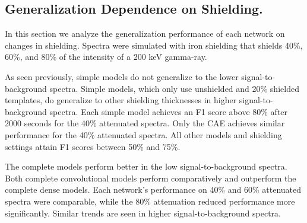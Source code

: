 \subsection{Generalization Dependence on Shielding.}

In this section we analyze the generalization performance of each network on changes in shielding. Spectra were simulated with iron shielding that shields 40\%, 60\%, and 80\% of the intensity of a 200 keV gamma-ray.

As seen previously, simple models do not generalize to the lower signal-to-background spectra. Simple models, which only use unshielded and 20\% shielded templates, do generalize to other shielding thicknesses in higher signal-to-background spectra. Each simple model achieves an F1 score above 80\% after 2000 seconds for the 40\% attenuated spectra. Only the CAE achieves similar performance for the 40\% attenuated spectra. All other models and shielding settings attain F1 scores between 50\% and 75\%.

The complete models perform better in the low signal-to-background spectra. Both complete convolutional models perform comparatively and outperform the complete dense models. Each network's performance on 40\% and 60\% attenuated spectra were comparable, while the 80\% attenuation reduced performance more significantly. Similar trends are seen in higher signal-to-background spectra. 


